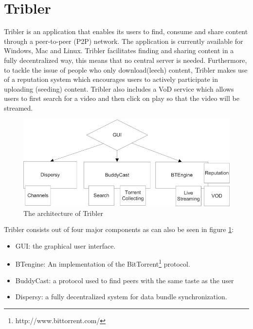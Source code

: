 \section{Tribler}
Tribler is an application that enables its users to find, consume and share content through a peer-to-peer (P2P) network. The application is currently available for Windows, Mac and Linux. Tribler facilitates finding and sharing content in a fully decentralized way, this means that no central server is needed. Furthermore, to tackle the issue of people who only download(leech) content, Tribler makes use of a reputation system which encourages users to actively participate in uploading (seeding) content. Tribler also includes a VoD service which allows users to first search for a video and then click on play so that the video will be streamed.

\begin{figure}[h]
	\centering
	\includegraphics[scale=0.4]{vod/images/tribler_component_overview.jpg}
	\caption{The architecture of Tribler\protect\footnotemark}
	\label{fig:tribler_components}
\end{figure}
\noindent Tribler consists out of four major components as can also be seen in figure \ref{fig:tribler_components}:
\begin{itemize}
	\item GUI: the graphical user interface.
	\item BTengine: An implementation of the BitTorrent\footnote{http://www.bittorrent.com/} protocol.
	\item BuddyCast: a protocol used to find peers with the same taste as the user\cite{tribler}
	\item Dispersy: a fully decentralized system for data bundle synchronization\cite{dispersy}.
\end{itemize}

